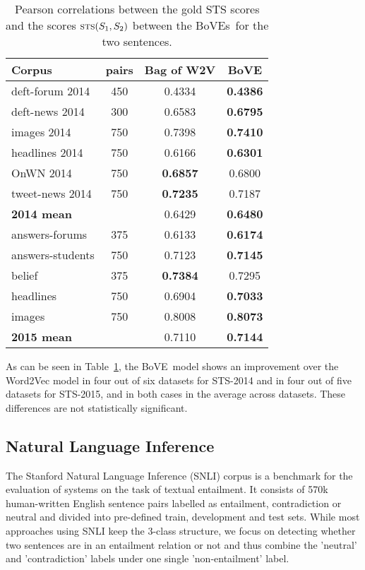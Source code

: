 \documentclass[11pt,a4paper]{article}
\DeclareMathOperator*{\STS}{\mbox{\sc sts}}
\newcommand{\bove}{Bo{\nolinebreak\hspace{-0.25ex}}VE}
\newcommand{\boves}{Bo{\nolinebreak\hspace{-0.25ex}}VEs}
\begin{document}
\begin{table}[htb]
\begin{tabular}{|l@{~}|@{~}c@{~}||@{~}c@{~}|c|}
\hline
Corpus & pairs & Bag of W2V & \bove \\
\hline\hline
{deft-forum 2014} & 450 & {0.4334} & {\bf 0.4386}\\
\hline
{deft-news 2014} & 300 & {0.6583} & {\bf0.6795}\\
\hline
{images 2014} & 750 & {0.7398} & {\bf 0.7410}\\
\hline
{headlines 2014} & 750 & {0.6166} & {\bf 0.6301}\\
\hline
{OnWN 2014} & 750 & {\bf 0.6857} & {0.6800}\\
\hline
{tweet-news 2014} & 750 & {\bf 0.7235} & {0.7187}\\
\hline
{\bf 2014 mean} &  & {0.6429} & {\bf 0.6480}\\
\hline\hline
{answers-forums} & 375 & {0.6133} &{\textbf{0.6174}}\\
\hline
{answers-students} & 750 & {0.7123}&{\textbf{0.7145}}\\
\hline
{belief} & 375 & {\textbf{0.7384}} &{0.7295} \\
\hline
{headlines} & 750 & {0.6904} &{\textbf{0.7033}} \\
\hline
{images} & 750 & {0.8008} &{\textbf{0.8073}} \\
\hline
{\bf 2015 mean} &  & {0.7110} &{\textbf{0.7144}} \\
\hline
\end{tabular}
\caption{ Pearson correlations between the gold STS scores and the scores
  $\STS(S_1,S_2)$ between the \boves\ for the two sentences.  }
\label{tab:results-STS}
\end{table}


As can be seen in Table~\ref{tab:results-STS},
the \bove\ model shows an improvement over the
Word2Vec model in four out of six datasets for STS-2014 and in four out of
five datasets for STS-2015, and in both cases in the average across datasets.
These differences are not statistically significant.


\subsection{Natural Language Inference}


The Stanford Natural Language Inference (SNLI) corpus \cite{snli:emnlp2015}
is a benchmark
for the evaluation of systems on the task of textual entailment. It consists
of 570k human-written English sentence pairs labelled as entailment,
contradiction or neutral and divided into pre-defined train, development and
test sets. While most approaches using SNLI keep the 3-class structure, we
focus on detecting whether two sentences are in an entailment relation or not
and thus combine the 'neutral' and 'contradiction' labels under one single
'non-entailment' label. 
\end{document}
